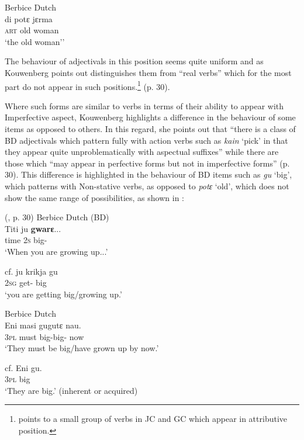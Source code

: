\ex
Berbice Dutch\\
\gll        di potɛ jɛrma   \\
\textsc{art} old woman  \\
\glt `the old woman''  \z \z

The behaviour of adjectivals in this position seems quite uniform and
as Kouwenberg points out distinguishes them from ``real verbs'' which
for the most part do not appear in such positions.\footnote{\citet{Winford1993} points to a small group of
  verbs in JC and GC which appear in attributive position.} (p. 30).

Where such forms are similar to verbs in terms of their ability to
appear with Imperfective aspect, Kouwenberg highlights a difference in
the behaviour of some items as opposed to others.  In this regard, she
points out that “there is a class of BD adjectivals which pattern
fully with action verbs such as \textit{kain} `pick' in that they
appear quite unproblematically with aspectual suffixes” while there
are those which “may appear in perfective forms but not in
imperfective forms” (p. 30).  This difference is highlighted in the
behaviour of BD items such as \textit{gu} `big', which patterns with
Non-stative verbs, as opposed to \textit{potɛ} `old', which does not
show the same range of possibilities, as shown in :

\ea%
\label{ex:3:13}
(\citealt{Kouwenberg1996}, p. 30) \ea
Berbice Dutch (BD)\\
\gll  Titi      ju \textbf{gwarɛ}...       \\
         time \textsc{2s} big-{\IPF}        \\
\glt `When you are growing up...'

cf. \gll  ju krikja gu\\
\textsc{2sg} get-{\IPF} big\\
\glt `you are getting big\slash growing up.'


\ex
Berbice Dutch  \\
\gll         Eni masi gugutɛ nau.          \\
\textsc{3pl} must big-big-{\PF} now                   \\
\glt       `They must be big\slash have grown up by now.'

cf.
\gll        Eni gu.\\
\textsc{3pl} big \\
\glt      `They are big.' (inherent or acquired) \z \z

\ea%
\label{ex:3:14}

